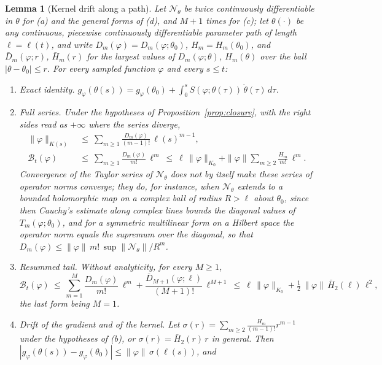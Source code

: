 \documentclass[11pt]{article}
\newtheorem{lemma}{Lemma}
\theoremstyle{definition}
\theoremstyle{remark}
\newcommand{\Net}{\mathcal{N}_\theta}    %
\newcommand{\cost}{\mathcal{B}}          %
\begin{document}
\begin{lemma}[Kernel drift along a path]\label{lem:drift}
Let $\Net$ be twice continuously differentiable in $\theta$ for (a) and the general forms of (d), and $M + 1$ times for (c); let $\theta(\cdot)$ be any continuous, piecewise continuously differentiable parameter path of length $\ell = \ell(t)$, and write $D_m(\varphi) = D_m(\varphi;\theta_0)$, $H_m = H_m(\theta_0)$, and $\bar D_m(\varphi;r)$, $\bar H_m(r)$ for the largest values of $D_m(\varphi;\theta)$, $H_m(\theta)$ over the ball $|\theta - \theta_0|\le r$.
For every sampled function $\varphi$ and every $s\le t$:
\begin{enumerate}[label=(\alph*)]
\item \emph{Exact identity.} $g_\varphi(\theta(s)) = g_\varphi(\theta_0) + \int_0^sS(\varphi;\theta(\tau))\,\dot\theta(\tau)\,d\tau$.
\item \emph{Full series.} Under the hypotheses of Proposition~\ref{prop:closure}, with the right sides read as $+\infty$ where the series diverge,
\begin{equation}\label{eq:costseries}
\begin{aligned}
\|\varphi\|_{K(s)}\ &\le\ \sum_{m\ge1}\frac{D_m(\varphi)}{(m-1)!}\,\ell(s)^{m-1},\\
\cost_t(\varphi)\ &\le\ \sum_{m\ge1}\frac{D_m(\varphi)}{m!}\,\ell^m\ \le\ \ell\,\|\varphi\|_{K_0} + \|\varphi\|\sum_{m\ge2}\frac{H_m}{m!}\,\ell^m .
\end{aligned}
\end{equation}
Convergence of the Taylor series of $\Net$ does not by itself make these series of operator norms converge; they do, for instance, when $\Net$ extends to a bounded holomorphic map on a complex ball of radius $R > \ell$ about $\theta_0$, since then Cauchy's estimate along complex lines bounds the diagonal values of $T_m(\varphi;\theta_0)$, and for a symmetric multilinear form on a Hilbert space the operator norm equals the supremum over the diagonal, so that $D_m(\varphi)\le\|\varphi\|\,m!\,\sup\|\Net\|/R^m$.
\item \emph{Resummed tail.} Without analyticity, for every $M\ge1$,
\begin{equation}\label{eq:costresum}
\cost_t(\varphi)\ \le\ \sum_{m=1}^{M}\frac{D_m(\varphi)}{m!}\,\ell^m + \frac{\bar D_{M+1}(\varphi;\ell)}{(M+1)!}\,\ell^{M+1}
\ \le\ \ell\,\|\varphi\|_{K_0} + \tfrac12\,\|\varphi\|\,\bar H_2(\ell)\,\ell^2 ,
\end{equation}
the last form being $M = 1$.
\item \emph{Drift of the gradient and of the kernel.} Let $\sigma(r) = \sum_{m\ge2}\frac{H_m}{(m-1)!}r^{m-1}$ under the hypotheses of (b), or $\sigma(r) = \bar H_2(r)\,r$ in general. Then $|g_\varphi(\theta(s)) - g_\varphi(\theta_0)|\le\|\varphi\|\,\sigma(\ell(s))$, and

\end{enumerate}
\end{lemma}
\end{document}
